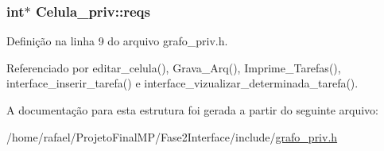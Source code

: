 \hypertarget{structCelula__priv_ad54839cd4d96e78a58c226ab2e8d0579}{}
\subsubsection[{reqs}]{\setlength{\rightskip}{0pt plus 5cm}int$\ast$ Celula\+\_\+priv\+::reqs}\label{structCelula__priv_ad54839cd4d96e78a58c226ab2e8d0579}


Definição na linha 9 do arquivo grafo\+\_\+priv.\+h.



Referenciado por editar\+\_\+celula(), Grava\+\_\+\+Arq(), Imprime\+\_\+\+Tarefas(), interface\+\_\+inserir\+\_\+tarefa() e interface\+\_\+vizualizar\+\_\+determinada\+\_\+tarefa().



A documentação para esta estrutura foi gerada a partir do seguinte arquivo\+:\begin{DoxyCompactItemize}
\item 
/home/rafael/\+Projeto\+Final\+M\+P/\+Fase2\+Interface/include/\hyperlink{grafo__priv_8h}{grafo\+\_\+priv.\+h}\end{DoxyCompactItemize}
